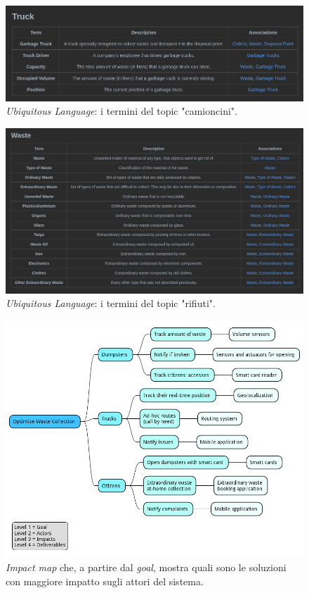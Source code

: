 \begin{figure}[H]
    \centering
    \includegraphics[width=\textwidth]{img/truck-ubiquitous-language}
    \caption{\textit{Ubiquitous Language}: i termini del topic "camioncini".}
    \label{fig:img/truck-ubiquitous-language}
\end{figure}


\begin{figure}[H]
    \centering
    \includegraphics[width=\textwidth]{img/waste-ubiquitous-language}
    \caption{\textit{Ubiquitous Language}: i termini del topic "rifiuti".}
    \label{fig:img/waste-ubiquitous-language}
\end{figure}


\begin{figure}[H]
    \centering
    \includegraphics[width=\textwidth]{uml/impact-mapping.pm}
    \caption{\textit{Impact map} che, a partire dal \textit{goal}, mostra quali sono le soluzioni con maggiore impatto sugli attori del sistema.}
    \label{fig:uml/impact-mapping}
\end{figure}


